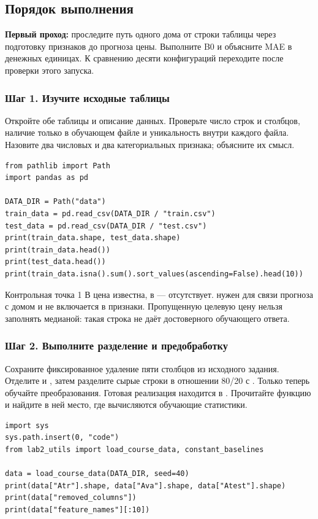 \subsection{Порядок выполнения}
\textbf{Первый проход:} проследите путь одного дома от строки таблицы через подготовку признаков до прогноза цены. Выполните B0 и объясните MAE в денежных единицах. К сравнению десяти конфигураций переходите после проверки этого запуска.

\subsubsection*{Шаг 1. Изучите исходные таблицы}
Откройте обе таблицы и описание данных. Проверьте число строк и столбцов,
наличие  только в обучающем файле и уникальность
 внутри каждого файла. Назовите два числовых и два
категориальных признака; объясните их смысл.

\begin{lstlisting}
from pathlib import Path
import pandas as pd

DATA_DIR = Path("data")
train_data = pd.read_csv(DATA_DIR / "train.csv")
test_data = pd.read_csv(DATA_DIR / "test.csv")
print(train_data.shape, test_data.shape)
print(train_data.head())
print(test_data.head())
print(train_data.isna().sum().sort_values(ascending=False).head(10))
\end{lstlisting}

\begin{keybox}{Контрольная точка 1}
В  цена известна, в  --- отсутствует.
 нужен для связи прогноза с домом и не включается в признаки.
Пропущенную целевую цену нельзя заполнять медианой: такая строка не даёт
достоверного обучающего ответа.
\end{keybox}

\subsubsection*{Шаг 2. Выполните разделение и предобработку}
Сохраните фиксированное удаление пяти столбцов из исходного задания.
Отделите  и , затем разделите сырые строки
в отношении 80/20 с . Только теперь обучайте
преобразования. Готовая реализация находится в .
Прочитайте функцию  и найдите в ней место,
где вычисляются обучающие статистики.

\begin{lstlisting}
import sys
sys.path.insert(0, "code")
from lab2_utils import load_course_data, constant_baselines

data = load_course_data(DATA_DIR, seed=40)
print(data["Atr"].shape, data["Ava"].shape, data["Atest"].shape)
print(data["removed_columns"])
print(data["feature_names"][:10])
\end{lstlisting}

